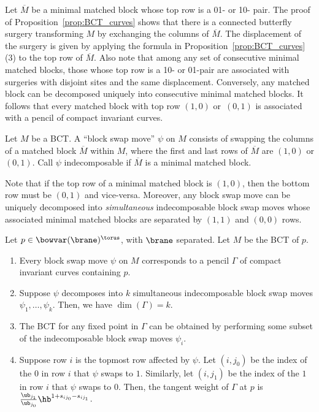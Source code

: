 Let $\overline M$ be a minimal matched block whose top row is a 01- or 10- pair. The proof of Proposition~\ref{prop:BCT_curves} shows that there is a connected butterfly surgery transforming $M$ by exchanging the columns of $\overline M$. The displacement of the surgery is given by applying the formula in Proposition~\ref{prop:BCT_curves}\,(3) to the top row of $\overline M$. Also note that among any set of consecutive minimal matched blocks, those whose top row is a 10- or 01-pair are associated with surgeries with disjoint sites and the same displacement. Conversely, any matched block can be decomposed uniquely into consecutive minimal matched blocks. It follows that every matched block with top row $(1, 0)$ or~$(0, 1)$ is associated with a pencil of compact invariant curves.

\begin{Definition}
Let $M$ be a BCT. A ``block swap move'' $\psi$ on $M$ consists of swapping the columns of a matched block $\overline M$ within $M$, where the first and last rows of $\overline M$ are $(1, 0)$ or $(0, 1)$. Call $\psi$ indecomposable if $\overline M$ is a minimal matched block.
\end{Definition}

Note that if the top row of a minimal matched block is $(1, 0)$, then the bottom row must be $(0, 1)$ and vice-versa. Moreover, any block swap move can be uniquely decomposed into \emph{simultaneous} indecomposable block swap moves whose associated minimal matched blocks are separated by $(1, 1)$ and $(0, 0)$ rows.

\begin{Proposition}
Let $p\in\bowvar(\brane)^\torus$, with $\brane$ separated. Let $M$ be the BCT of $p$.
\begin{enumerate}\itemsep=0pt
\item[$(1)$] Every block swap move $\psi$ on $M$ corresponds to a pencil $\Gamma$ of compact invariant curves containing $p$.
\item[$(2)$] Suppose $\psi$ decomposes into $k$ simultaneous indecomposable block swap moves $\psi_1, \dots , \psi_k$. Then, we have $\dim(\Gamma) = k$.
\item[$(3)$] The BCT for any fixed point in $\Gamma$ can be obtained by performing some subset of the indecomposable block swap moves $\psi_i$.
\item[$(4)$] Suppose row $i$ is the topmost row affected by $\psi$. Let $(i, j_0)$ be the index of the $0$ in row $i$ that $\psi$ swaps to $1$. Similarly, let $(i, j_1)$ be the index of the $1$ in row $i$ that $\psi$ swaps to $0$. Then, the tangent weight of $\Gamma$ at $p$ is $\frac{\ub_{j_1}}{\ub_{j_0}}\hb^{1+s_{i j_0}-s_{i j_1}}$.
\end{enumerate}
\end{Proposition}

